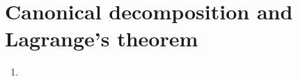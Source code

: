 \section{Canonical decomposition and Lagrange's theorem}
\begin{enumerate}
    \item
\end{enumerate}